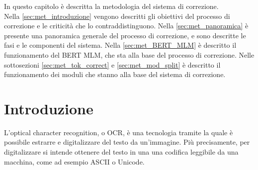 In questo capitolo è descritta la metodologia del sistema di correzione.\\
Nella \autoref{sec:met_introduzione} vengono descritti gli obiettivi del processo di correzione e le criticità che lo contraddistinguono.
Nella \autoref{sec:met_panoramica} è presente una panoramica generale del processo di correzione, e sono descritte le fasi e le componenti del sistema. Nella \autoref{sec:met_BERT_MLM} è descritto il funzionamento del BERT MLM, che sta alla base del processo di correzione. Nelle sottosezioni \ref{sec:met_tok_correct} e \ref{sec:met_mod_split} è descritto il funzionamento dei moduli che stanno alla base del sistema di correzione.


\section{Introduzione}
\label{sec:met_introduzione}
L'optical character recognition, o OCR, è una tecnologia tramite la quale è possibile estrarre e digitalizzare del testo da un'immagine. Più precisamente, per digitalizzare si intende ottenere del testo in una una codifica leggibile da una macchina, come ad esempio ASCII o Unicode.

